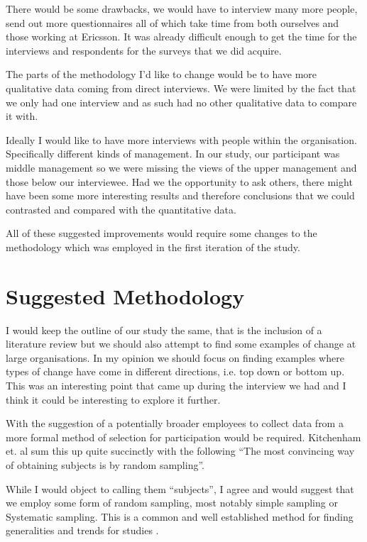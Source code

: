 \documentclass[conference]{IEEEtran}
\begin{document}
There would be some drawbacks, we would have to interview many more people, send out more questionnaires all of which take time from both ourselves and those working at Ericsson. It was already difficult enough to get the time for the interviews and respondents for the surveys that we did acquire. 

The parts of the methodology I'd like to change would be to have more qualitative data coming from direct interviews. We were limited by the fact that we only had one interview and as such had no other qualitative data to compare it with. 

Ideally I would like to have more interviews with people within the organisation. Specifically different kinds of management. In our study, our participant was middle management so we were missing the views of the upper management and those below our interviewee. Had we the opportunity to ask others, there might have been some more interesting results and therefore conclusions that we could contrasted and compared with the quantitative data.

All of these suggested improvements would require some changes to the methodology which was employed in the first iteration of the study.

\section{Suggested Methodology}

I would keep the outline of our study the same, that is the inclusion of a
literature review but we should also attempt to find some examples of change at large organisations. In my opinion we should focus on finding examples where types of change have come in different directions, i.e. top down or bottom up. This was an interesting point that came up during the interview we had and I think it could be interesting to explore it further.

With the suggestion of a potentially broader employees to collect data from a more formal method of selection for participation would be required. Kitchenham et. al sum this up quite succinctly with the following ``The most convincing way of obtaining subjects is by random sampling''\cite{kitchenham2002preliminary}. 

While I would object to calling them ``subjects'', I agree and would suggest that we employ some form of random sampling, most notably simple sampling or Systematic sampling. This is a common and well established method for finding generalities and trends for studies \cite{kitchenham2002preliminary}.
\end{document}

